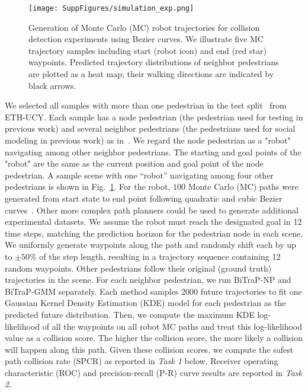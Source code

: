 \documentclass[letterpaper, 10 pt, conference]{ieeeconf}
\begin{document}
\begin{figure}[htbp]
    \centering
    \texttt{[image: SuppFigures/simulation\_exp.png]}
    \caption{Generation of Monte Carlo (MC) robot trajectories for collision detection experiments using Bezier curves. We illustrate five MC trajectory samples including start (robot icon) and end (red star) waypoints. Predicted trajectory distributions of neighbor pedestrians are plotted as a heat map; their walking directions are indicated by black arrows.}
    \label{fig:simulation_exp}
\end{figure}

 We selected all samples with more than one pedestrian in the test split~\cite{gupta2018social} from ETH-UCY. Each sample has a node pedestrian (the pedestrian used for testing in previous work) and several neighbor pedestrians (the pedestrians used for social modeling in previous work) as
in~\cite{gupta2018social,salzmann2020trajectron++}. 
We regard the node pedestrian as a "robot" navigating among other neighbor pedestrians. The starting and goal points of the "robot" are the same as the current position and goal point of the node pedestrian. A sample scene with one ``robot'' navigating among four other pedestrians is shown in Fig.~\ref{fig:simulation_exp}. For the robot, $100$ Monte Carlo (MC) paths were generated from start state to end point following quadratic and cubic Bezier curves~\cite{gallier2000curves}. Other more complex path planners could be used to generate additional experimental datasets. We assume the robot must reach the designated goal in 12 time steps, matching the prediction horizon for the pedestrian node in each scene. We uniformly generate waypoints along the path and randomly shift each by up to $\pm50\%$ of the step length, resulting in a trajectory sequence containing 12 random waypoints. Other pedestrians follow their original (ground truth) trajectories in the scene. For each neighbor pedestrian, we run BiTraP-NP and BiTraP-GMM separately. Each method samples 2000 future trajectories to fit one Gaussian Kernel Density Estimation (KDE) model for each pedestrian as the predicted future distribution. 
Then, we compute the maximum KDE log-likelihood of all the waypoints on all robot MC paths and treat this log-likelihood value as a collision score. The higher the collision score, the more likely a collision will happen along this path. Given these collision scores, we compute the safest path collision rate (SPCR) as reported in \textit{Task 1} below.  Receiver operating characteristic (ROC) and precision-recall (P-R) curve results are reported in \textit{Task 2}. 
\end{document}
